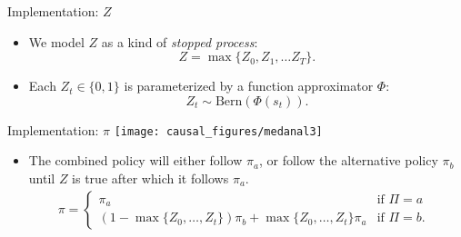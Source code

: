 \begin{frame}{Implementation: $Z$}
    \begin{itemize}
        \item We model $Z$ as a kind of \emph{stopped process}:
        \begin{equation*}
        	Z = \max\{Z_0, Z_1, \dots Z_T\}.
        \end{equation*}	
        \item Each $Z_t \in \{0,1\}$ is parameterized by a function approximator $\Phi$:
        \begin{equation*}
            Z_t \sim \textrm{Bern}(\Phi(s_t)).
        \end{equation*}
    \end{itemize}
\end{frame}

\note[itemize]{
    \item 
}

\begin{frame}{Implementation: $\pi$}
	\centering
	\texttt{[image: causal\_figures/medanal3]}

	\begin{itemize}
    	\item The combined policy will either follow $\pi_a$, or follow the alternative policy $\pi_b$ until $Z$ is true after which it follows $\pi_a$. 
    \begin{align*}
    	\pi = \begin{cases} \pi_a & \mbox{if $\Pi = a$ } \\ \left(1-\max\{Z_{0}, \dots, Z_t\} \right)\pi_b +\max\{Z_{0}, \dots, Z_t\} \pi_a
    		& \mbox{if $\Pi = b$. }\end{cases} %
    \end{align*}
	\end{itemize}	
\end{frame}


